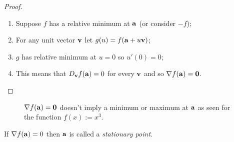 \begin{proof}
    \begin{enumerate}
        \item Suppose \(f\) has a relative minimum at \(\aa\) (or consider \(-f\));
        \item For any unit vector \(\vv\) let \(g(u) = f(\aa+u\vv)\);
        \item \(g\) has relative minimum at \(u=0\) so \(u'(0)=0\);
        \item This means that \(D_{\vv} f(\aa) = 0\) for every \(\vv\) and so \(\nabla f (\aa)= \mathbf{0}\). \qedhere
    \end{enumerate}
\end{proof}
\begin{figure}
    \caption{\(\nabla f(\aa) =  \mathbf{0}\) doesn't imply a minimum or maximum at \(\aa\) as seen for the function \(f(x):=x^3\).}
\end{figure}



\begin{definition}
    If \(\nabla f(\aa)=0\) then \(\aa\) is called a \emph{stationary point}.
\end{definition}




